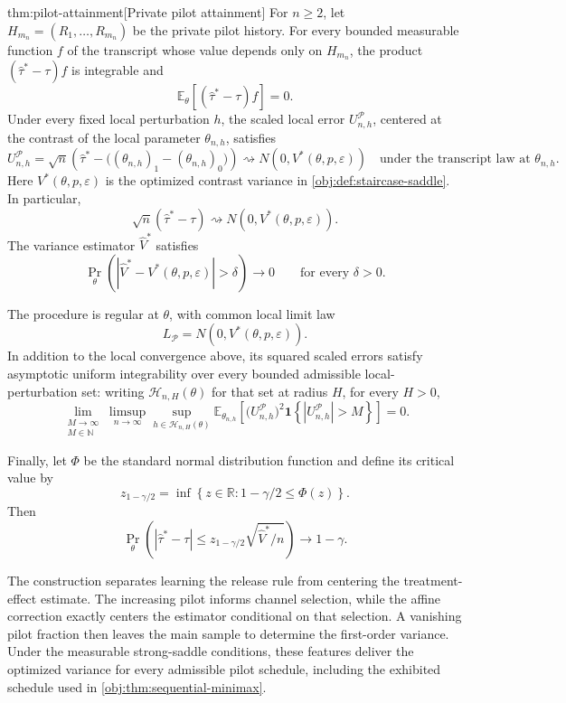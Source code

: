 \documentclass[11pt]{article}
\begin{document}
\begin{theoremv}{thm:pilot-attainment}[Private pilot attainment]
For \(n\ge2\), let \(H_{m_n}=(R_1,\ldots,R_{m_n})\) be the private pilot history. For every bounded measurable function \(f\) of the transcript whose value depends only on \(H_{m_n}\), the product \((\widehat\tau^*-\tau)f\) is integrable and
\[
\mathbb E_{\theta}\!\left[(\widehat\tau^*-\tau)f\right]=0.
\]
Under every fixed local perturbation \(h\), the scaled local error \(U_{n,h}^{\mathcal P}\), centered at the contrast of the local parameter \(\theta_{n,h}\), satisfies
\[
U_{n,h}^{\mathcal P}
=
\sqrt n\left(
\widehat\tau^*
-
\bigl((\theta_{n,h})_1-(\theta_{n,h})_0\bigr)
\right)
\rightsquigarrow
N\!\left(0,V^*(\theta,p,\varepsilon)\right)
\quad\text{under the transcript law at }\theta_{n,h}.
\]
Here \(V^*(\theta,p,\varepsilon)\) is the optimized contrast variance in \cref{obj:def:staircase-saddle}. In particular,
\[
\sqrt n(\widehat\tau^*-\tau)
\rightsquigarrow N\!\left(0,V^*(\theta,p,\varepsilon)\right).
\]
The variance estimator \(\widehat V^*\) satisfies
\[
\Pr_{\theta}\!\left(
\left|\widehat V^*-V^*(\theta,p,\varepsilon)\right|>\delta
\right)\longrightarrow0
\qquad\text{for every }\delta>0.
\]

The procedure is regular at \(\theta\), with common local limit law
\[
L_{\mathcal P}=N\!\left(0,V^*(\theta,p,\varepsilon)\right).
\]
In addition to the local convergence above, its squared scaled errors satisfy asymptotic uniform integrability over every bounded admissible local-perturbation set: writing \(\mathcal H_{n,H}(\theta)\) for that set at radius \(H\), for every \(H>0\),
\[
\lim_{\substack{M\to\infty\\ M\in\mathbb N}}
\limsup_{n\to\infty}
\sup_{h\in\mathcal H_{n,H}(\theta)}
\mathbb E_{\theta_{n,h}}\!\left[
\bigl(U_{n,h}^{\mathcal P}\bigr)^2
\mathbf 1\!\left\{\left|U_{n,h}^{\mathcal P}\right|>M\right\}
\right]
=0.
\]

Finally, let \(\Phi\) be the standard normal distribution function and define its critical value by
\[
z_{1-\gamma/2}
=
\inf\left\{z\in\mathbb R:1-\gamma/2\le\Phi(z)\right\}.
\]
Then
\[
\Pr_{\theta}\!\left(
\left|\widehat\tau^*-\tau\right|
\le z_{1-\gamma/2}\sqrt{\widehat V^*/n}
\right)\longrightarrow1-\gamma.
\]
\end{theoremv}

The construction separates learning the release rule from centering the treatment-effect estimate. The increasing pilot informs channel selection, while the affine correction exactly centers the estimator conditional on that selection. A vanishing pilot fraction then leaves the main sample to determine the first-order variance. Under the measurable strong-saddle conditions, these features deliver the optimized variance for every admissible pilot schedule, including the exhibited schedule used in \cref{obj:thm:sequential-minimax}.
\end{document}
